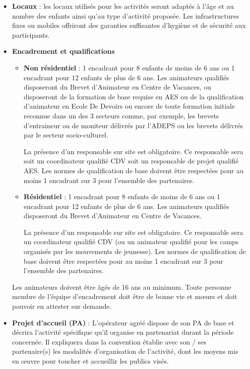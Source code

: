 \begin{itemize}
\item \textbf{Locaux} : les locaux utilisés pour les activités seront adaptés à l’âge et au nombre des enfants ainsi qu’au type d’activité proposée. Les infrastructures fixes ou mobiles offriront des garanties suffisantes d’hygiène et de sécurité aux participants.
\item \textbf{Encadrement et qualifications}

\begin{itemize}
    \item \textbf{Non résidentiel} : 1 encadrant pour 8 enfants de moins de 6 ans ou 1 encadrant pour 12 enfants de plus de 6 ans. Les animateurs qualifiés disposeront du Brevet d’Animateur en Centre de Vacances, ou disposeront de la formation de base requise en AES ou de la qualification d’animateur en Ecole De Devoirs ou encore de toute formation initiale reconnue dans un des 3 secteurs comme, par exemple, les brevets d’entraineur ou de moniteur délivrés par l’ADEPS ou les brevets délivrés par le secteur socio-culturel.
    
    La présence d’un responsable sur site est obligatoire. Ce responsable sera soit un coordinateur qualifié CDV soit un responsable de projet qualifié AES. Les normes de qualification de base doivent être respectées pour au moins 1 encadrant sur 3 pour l’ensemble des partenaires.

    \item \textbf{Résidentiel} : 1 encadrant pour 8 enfants de moins de 6 ans ou 1 encadrant pour 12 enfants de plus de 6 ans. Les animateurs qualifiés disposeront du Brevet d’Animateur en Centre de Vacances.
    
    La présence d’un responsable sur site est obligatoire. Ce responsable sera un coordinateur qualifié CDV (ou un animateur qualifié pour les camps organisés par les mouvements de jeunesse). Les normes de qualification de base doivent être respectées pour au moins 1 encadrant sur 3 pour l’ensemble des partenaires.
    

\end{itemize}
Les animateurs doivent être âgés de 16 ans au minimum. Toute personne membre de l’équipe d’encadrement doit être de bonne vie et mœurs et doit pouvoir en attester sur demande.

\item \textbf{Projet d’accueil (PA)} : L’opérateur agréé dispose de son PA de base et décrira l’activité spécifique qu’il organise en partenariat durant la période concernée. Il expliquera dans la convention établie avec son / ses partenaire(s) les modalités d’organisation de l’activité, dont les moyens mis en œuvre pour toucher et accueillir les publics visés.


\end{itemize}
